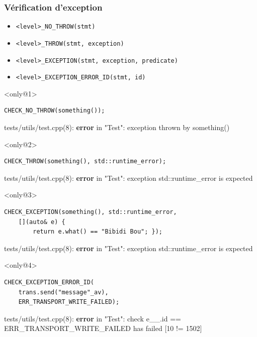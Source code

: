 \documentclass{beamer}
\begin{document}
\begin{frame}[fragile]
\frametitle{Vérification d'exception}

\begin{itemize}[<+->]
 \item \lstinline{<level>_NO_THROW(stmt)}
 \item \lstinline{<level>_THROW(stmt, exception)}
 \item \lstinline{<level>_EXCEPTION(stmt, exception, predicate)}
 \item \lstinline{<level>_EXCEPTION_ERROR_ID(stmt, id)}
\end{itemize}

\begin{exampleblock}{}<only@1>
\begin{lstlisting}
CHECK_NO_THROW(something());
\end{lstlisting}
{\color{f7}tests/utils/test.cpp(8)}: \textbf{\color{f1}error} in "{\color{f5}Test}":
 {\color{f4}exception thrown by something()}
\end{exampleblock}

\begin{exampleblock}{}<only@2>
\begin{lstlisting}
CHECK_THROW(something(), std::runtime_error);
\end{lstlisting}
{\color{f7}tests/utils/test.cpp(8)}: \textbf{\color{f1}error} in "{\color{f5}Test}":
 {\color{f4}exception std::runtime\_error is expected}
\end{exampleblock}

\begin{exampleblock}{}<only@3>
\begin{lstlisting}
CHECK_EXCEPTION(something(), std::runtime_error,
    [](auto& e) {
        return e.what() == "Bibidi Bou"; });
\end{lstlisting}
{\color{f7}tests/utils/test.cpp(8)}: \textbf{\color{f1}error} in "{\color{f5}Test}":
 {\color{f4}exception std::runtime\_error is expected}
\end{exampleblock}

\begin{exampleblock}{}<only@4>
\begin{lstlisting}
CHECK_EXCEPTION_ERROR_ID(
    trans.send("message"_av),
    ERR_TRANSPORT_WRITE_FAILED);
\end{lstlisting}
{\color{f7}tests/utils/test.cpp(8)}: \textbf{\color{f1}error} in "{\color{f5}Test}":
 {\color{f4}check} {\color{f1}e\_\_.id} {\color{f3}==} {\color{f1}ERR\_TRANSPORT\_WRITE\_FAILED has} failed [{\color{f6}10} {\color{f3}!=} {\color{f6}1502}]
\end{exampleblock}
\end{frame}
\end{document}
